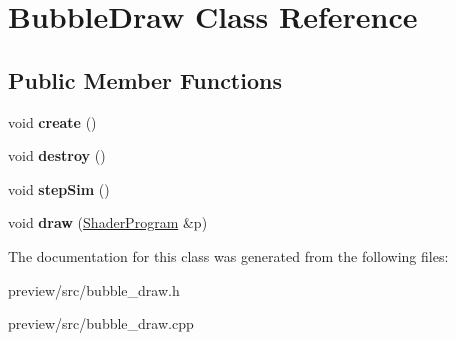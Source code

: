 \hypertarget{class_bubble_draw}{}\section{Bubble\+Draw Class Reference}
\label{class_bubble_draw}
\subsection*{Public Member Functions}
\begin{DoxyCompactItemize}
\item 
\hypertarget{class_bubble_draw_a2ca19c327e25ad0f4ebca0c1fe9b6b4b}{}void {\bfseries create} ()\label{class_bubble_draw_a2ca19c327e25ad0f4ebca0c1fe9b6b4b}

\item 
\hypertarget{class_bubble_draw_a89639f544b3144e2d1a48b36f476410c}{}void {\bfseries destroy} ()\label{class_bubble_draw_a89639f544b3144e2d1a48b36f476410c}

\item 
\hypertarget{class_bubble_draw_ab47721128b96d886f624b0570e3d7305}{}void {\bfseries step\+Sim} ()\label{class_bubble_draw_ab47721128b96d886f624b0570e3d7305}

\item 
\hypertarget{class_bubble_draw_a18520d87ca008ae85ed55bb801e847e8}{}void {\bfseries draw} (\hyperlink{class_shader_program}{Shader\+Program} \&p)\label{class_bubble_draw_a18520d87ca008ae85ed55bb801e847e8}

\end{DoxyCompactItemize}


The documentation for this class was generated from the following files\+:\begin{DoxyCompactItemize}
\item 
preview/src/bubble\+\_\+draw.\+h\item 
preview/src/bubble\+\_\+draw.\+cpp\end{DoxyCompactItemize}
